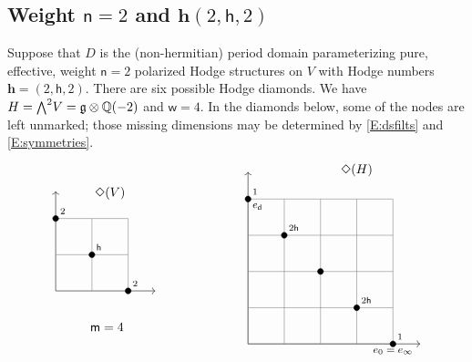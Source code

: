 \documentclass[12pt]{amsart}
\numberwithin{equation}{section}
\numberwithin{table}{section}
\newcommand{\hsp}[1]{{\hbox{\hspace{#1}}}}
\def\fg{\mathfrak{g}}
\def\sfm{\mathsf{m}}
\def\sfn{\mathsf{n}}
\def\bQ{\mathbb{Q}}
\def\sfw{\mathsf{w}}
\def\ot{\otimes}
\def\tw{\hbox{\small $\bigwedge$}}
\theoremstyle{definition}
\theoremstyle{definition}
\theoremstyle{remark}
\def\sfd{\mathsf{d}}
\def\bfh{\mathbf{h}}
\def\sfh{\mathsf{h}}
\begin{document}
\subsection{Weight $\sfn=2$ and $\bfh(2,\sfh,2)$} \label{S:hd2}

Suppose that $D$ is the (non-hermitian) period domain parameterizing pure, effective, weight $\sfn=2$ polarized Hodge structures on $V$ with Hodge numbers $\bfh = (2,\sfh,2)$.  There are six possible Hodge diamonds.  We have $H = \tw^2V = \fg \ot \bQ(-2)$ and $\sfw=4$.  In the diamonds below, some of the nodes are left unmarked; those missing dimensions may be determined by \eqref{E:dsfilts} and \eqref{E:symmetries}.
\begin{equation} \label{E:hd2-0}
\begin{tikzpicture}[baseline={([yshift=-.5ex]current bounding box.center)}]
  \node [above] at (1.5,2.4) {$\Diamond(V)$}; 		%
  \draw [<->] (0,2.75) -- (0,0) -- (2.75,0);		%
  \node [left] at (2,-1) {$\sfm=4$};				%
  \draw [gray] (1,0) -- (1,2);
  \draw [gray] (2,0) -- (2,2);
  \draw [gray] (0,1) -- (2,1);
  \draw [gray] (0,2) -- (2,2);
  \draw [fill] (0,2) circle [radius=0.08];
  \node [above right] at (0,2) {\scriptsize{$2$}};
  \draw [fill] (1,1) circle [radius=0.08];
  \node [above right] at (1,1) {\scriptsize{$\sfh$}};
  \draw [fill] (2,0) circle [radius=0.08];
  \node [above right] at (2,0) {\scriptsize{$2$}};
\end{tikzpicture}
\hsp{70pt}
\begin{tikzpicture}[baseline={([yshift=-.5ex]current bounding box.center)}]
  \node [above] at (1,2.5) {$\Diamond(H)$};			%
  \draw [<->] (-2,2.75) -- (-2,-2) -- (2.75,-2);	%
  \draw [gray] (0,-2) -- (0,2);						%
  \draw [gray] (-2,0) -- (2,0);						%
  \draw [gray] (2,-2) -- (2,2);
  \draw [gray] (1,-2) -- (1,2);
  \draw [gray] (-2,-2) -- (-2,2);
  \draw [gray] (-1,-2) -- (-1,2);
  \draw [gray] (-2,2) -- (2,2);
  \draw [gray] (-2,1) -- (2,1);
  \draw [gray] (-2,-1) -- (2,-1);
  \draw [gray] (-2,-2) -- (2,-2);
  \draw [fill] (-2,2) circle [radius=0.08];
  \node [above right] at (-2,2) {\scriptsize{$1$}};
  \node [below right] at (-2,2) {\footnotesize{$e_\sfd$}};
  \draw [fill] (-1,1) circle [radius=0.08];
  \node [above right] at (-1,1) {\scriptsize{$2\sfh$}};
  \draw [fill] (0,0) circle [radius=0.08];
  \node [above right] at (0,0) {};
  \draw [fill] (1,-1) circle [radius=0.08];
  \node [above right] at (1,-1) {\scriptsize{$2\sfh$}};
  \draw [fill] (2,-2) circle [radius=0.08];
  \node [above right] at (2,-2) {\scriptsize{$1$}};
  \node [below] at (2,-2) {\footnotesize{$e_0=e_\infty$}};
\end{tikzpicture}
\end{equation}
\end{document}
